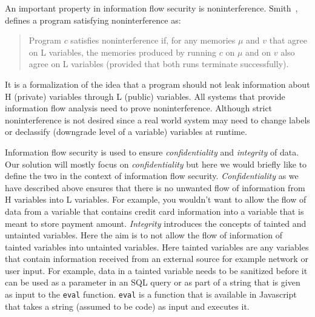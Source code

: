 An important property in information flow security is noninterference. Smith~\cite{PrincInfoSec},
defines a program satisfying noninterference as:

\begin{quotation}
	\noindent Program $c$ satisfies noninterference if, for
	any memories $\mu$ and $v$ that agree on L variables, the memories produced by
	running $c$ on $\mu$ and on $v$ also agree on L variables (provided that both runs
	terminate successfully).
\end{quotation}
It is a formalization of the idea that a program should not leak
information about H (private) variables through L (public) variables. All systems
that provide information flow analysis need to prove noninterference. Although
strict noninterference is not desired since a real world system may need to change
labels or declassify (downgrade level of a variable) variables at runtime.

Information flow security is used to ensure \textit{confidentiality} and \textit{integrity}
of data. Our solution will mostly focus on \textit{confidentiality} but here we would
briefly like to define the two in the context of information flow security. \textit{Confidentiality}
as we have described above ensures that there is no unwanted flow of information
from H variables into L variables. For example, you wouldn't want to allow the
flow of data from a variable that contains credit card information into a variable
that is meant to store payment amount. \textit{Integrity} introduces the concepts of
tainted and untainted variables. Here the aim is to not allow the flow of information
of tainted variables into untainted variables. Here tainted variables are any
variables that contain information received from an external source for example
network or user input. For example, data in a tainted variable needs to be sanitized
before it can be used as a parameter in an SQL query or as part of a string that
is given as input to the \texttt{eval} function. \texttt{eval} is a function that
is available in Javascript that takes a string (assumed to be code) as input and
executes it.

